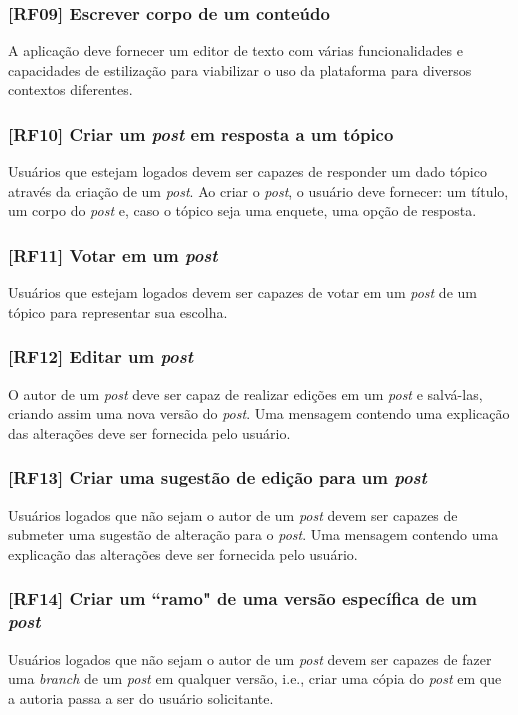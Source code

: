 \subsubsection{[RF09] Escrever corpo de um conteúdo}
A aplicação deve fornecer um editor de texto com várias funcionalidades e capacidades de estilização para viabilizar o uso da plataforma para diversos contextos diferentes.

\subsubsection{[RF10] Criar um \textit{post} em resposta a um tópico}
Usuários que estejam logados devem ser capazes de responder um dado tópico através da criação de um \textit{post}. Ao criar o \textit{post}, o usuário deve fornecer: um título, um corpo do \textit{post} e, caso o tópico seja uma enquete, uma opção de resposta.

\subsubsection{[RF11] Votar em um \textit{post}}
Usuários que estejam logados devem ser capazes de votar em um \textit{post} de um tópico para representar sua escolha.

\subsubsection{[RF12] Editar um \textit{post}}
O autor de um \textit{post} deve ser capaz de realizar edições em um \textit{post} e salvá-las, criando assim uma nova versão do \textit{post}. Uma mensagem contendo uma explicação das alterações deve ser fornecida pelo usuário.

\subsubsection{[RF13] Criar uma sugestão de edição para um \textit{post}}
Usuários logados que não sejam o autor de um \textit{post} devem ser capazes de submeter uma sugestão de alteração para o \textit{post}. Uma mensagem contendo uma explicação das alterações deve ser fornecida pelo usuário.

\subsubsection{[RF14] Criar um “ramo" de uma versão específica de um \textit{post}}
Usuários logados que não sejam o autor de um \textit{post} devem ser capazes de fazer uma \textit{branch} de um \textit{post} em qualquer versão, i.e., criar uma cópia do \textit{post} em que a autoria passa a ser do usuário solicitante.

